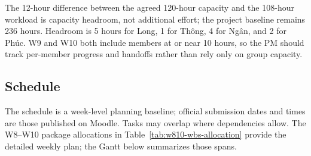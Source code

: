 The 12-hour difference between the agreed 120-hour capacity and the
108-hour workload is capacity headroom, not additional effort; the project
baseline remains 236 hours. Headroom is 5 hours for Long, 1 for Th\^ong, 4 for
Ng\^an, and 2 for Ph\'uc. W9 and W10 both include members at or near 10 hours,
so the PM should track per-member progress and handoffs rather than rely only on
group capacity.

\subsection{Schedule}

The schedule is a week-level planning baseline; official submission dates
and times are those published on Moodle. Tasks may overlap where dependencies
allow. The W8--W10 package allocations in Table~\ref{tab:w810-wbs-allocation}
provide the detailed weekly plan; the Gantt below summarizes those spans.

